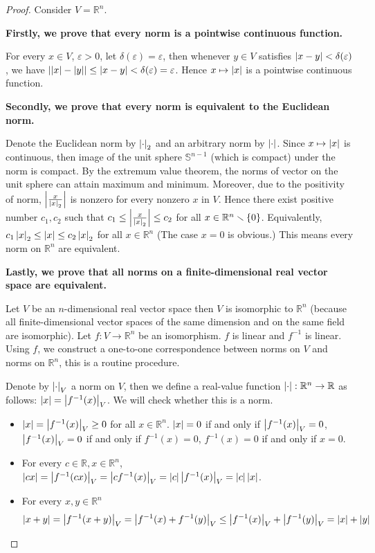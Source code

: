 \begin{proof}
	Consider $V = \mathbb{R}^{n}$.

	\textbf{Firstly, we prove that every norm is a pointwise continuous function.}

	For every $x\in V$, $\varepsilon > 0$, let $\delta(\varepsilon) = \varepsilon$, then whenever $y\in V$ satisfies $\left\vert{x - y}\right\vert < \delta(\varepsilon)$, we have $\left\vert{\left\vert{x}\right\vert - \left\vert{y}\right\vert}\right\vert \leq \left\vert{x - y}\right\vert < \delta(\varepsilon) = \varepsilon$. Hence $x\mapsto \left\vert{x}\right\vert$ is a pointwise continuous function.

	\textbf{Secondly, we prove that every norm is equivalent to the Euclidean norm.}

	Denote the Euclidean norm by $\left\vert{\cdot}\right\vert_{2}$ and an arbitrary norm by $\left\vert{\cdot}\right\vert$. Since $x\mapsto \left\vert{x}\right\vert$ is continuous, then image of the unit sphere $\mathbb{S}^{n-1}$ (which is compact) under the norm is compact. By the extremum value theorem, the norms of vector on the unit sphere can attain maximum and minimum. Moreover, due to the positivity of norm, $\left\vert{\frac{x}{\left\vert{x}\right\vert_{2}}}\right\vert$ is nonzero for every nonzero $x$ in $V$. Hence there exist positive number $c_{1}, c_{2}$ such that $c_{1} \leq \left\vert{\frac{x}{\left\vert{x}\right\vert_{2}}}\right\vert \leq c_{2}$ for all $x \in \mathbb{R}^{n}\smallsetminus \left\{{0}\right\}$. Equivalently, $c_{1}\left\vert{x}\right\vert_{2} \leq \left\vert{x}\right\vert \leq c_{2}\left\vert{x}\right\vert_{2}$ for all $x \in \mathbb{R}^{n}$ (The case $x = 0$ is obvious.) This means every norm on $\mathbb{R}^{n}$ are equivalent.

	\textbf{Lastly, we prove that all norms on a finite-dimensional real vector space are equivalent.}

	Let $V$ be an $n$-dimensional real vector space then $V$ is isomorphic to $\mathbb{R}^{n}$ (because all finite-dimensional vector spaces of the same dimension and on the same field are isomorphic). Let $f: V \to \mathbb{R}^{n}$ be an isomorphism. $f$ is linear and $f^{-1}$ is linear. Using $f$, we construct a one-to-one correspondence between norms on $V$ and norms on $\mathbb{R}^{n}$, this is a routine procedure.

	Denote by $\left\vert{\cdot}\right\vert_{V}$ a norm on $V$, then we define a real-value function $\left\vert{\cdot}\right\vert: \mathbb{R}^{n} \to \mathbb{R}$ as follows: $\left\vert{x}\right\vert = \left\vert{f^{-1}(x)}\right\vert_{V}$. We will check whether this is a norm.
	\begin{itemize}
		\item $\left\vert{x}\right\vert = \left\vert{f^{-1}(x)}\right\vert_{V} \geq 0$ for all $x\in \mathbb{R}^{n}$. $\left\vert{x}\right\vert = 0$ if and only if $\left\vert{f^{-1}(x)}\right\vert_{V} = 0$, $\left\vert{f^{-1}(x)}\right\vert_{V} = 0$ if and only if $f^{-1}(x) = 0$, $f^{-1}(x) = 0$ if and only if $x = 0$.
		\item For every $c\in \mathbb{R}, x\in\mathbb{R}^{n}$, $\left\vert{cx}\right\vert = \left\vert{f^{-1}(cx)}\right\vert_{V} = \left\vert{cf^{-1}(x)}\right\vert_{V} = \left\vert{c}\right\vert\left\vert{f^{-1}(x)}\right\vert_{V} = \left\vert{c}\right\vert\left\vert{x}\right\vert$.
		\item For every $x, y\in \mathbb{R}^{n}$
		      \begin{equation*}
			      \left\vert{x + y}\right\vert = \left\vert{f^{-1}(x + y)}\right\vert_{V} = \left\vert{f^{-1}(x) + f^{-1}(y)}\right\vert_{V} \leq \left\vert{f^{-1}(x)}\right\vert_{V} + \left\vert{f^{-1}(y)}\right\vert_{V} = \left\vert{x}\right\vert + \left\vert{y}\right\vert
		      \end{equation*}
	\end{itemize}


\end{proof}
